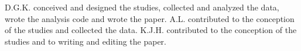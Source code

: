 D.G.K. conceived and designed the studies, collected and analyzed the data, wrote the analysis code and wrote the paper. A.L. contributed to the conception of the studies and collected the data. K.J.H. contributed to the conception of the studies and to writing and editing the paper.
